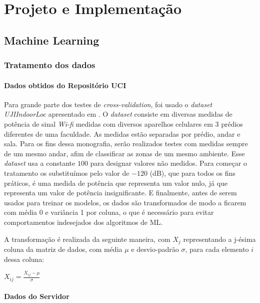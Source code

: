 \chapter{Projeto e Implementação}\label{chp:ml}

\section{Machine Learning}

\subsection{Tratamento dos dados}\label{sec:data1}

\subsubsection{Dados obtidos do Repositório UCI}
	Para grande parte dos testes de \textit{cross-validation}, foi usado o \textit{dataset}  \textit{UJIIndoorLoc} apresentado em \cite{uji}. O \textit{dataset} consiste em diversas medidas de potência de sinal \textit{Wi-fi} medidas com diversos aparelhos celulares em 3 prédios diferentes de uma faculdade. As medidas estão separadas por prédio, andar e sala. Para os fins dessa monografia, serão realizados testes com medidas sempre de um mesmo andar, afim de classificar as zonas de um mesmo ambiente.  Esse  \textit{dataset} usa a constante $100$ para designar valores não medidos. Para começar o tratamento os substituímos pelo valor de $-120$ (dB), que para todos os fins práticos, é uma medida de potência que representa um valor nulo, já que representa um valor de potência insignificante. E finalmente, antes de serem usados para treinar os modelos, os dados são transformados de modo a ficarem com média 0 e variância 1 por coluna, o que é necessário para evitar comportamentos indesejados dos algoritmos de ML.

A transformação é realizada da seguinte maneira, com $X_j$ representando a j-ésima coluna da matriz de dados, com média $\mu$ e desvio-padrão $\sigma$, para cada elemento $i$ dessa coluna:

\begin{center}
$X_{ij}=\frac{X_{ij}-\mu}{\sigma}$
\end{center}

\subsubsection{Dados do Servidor}

